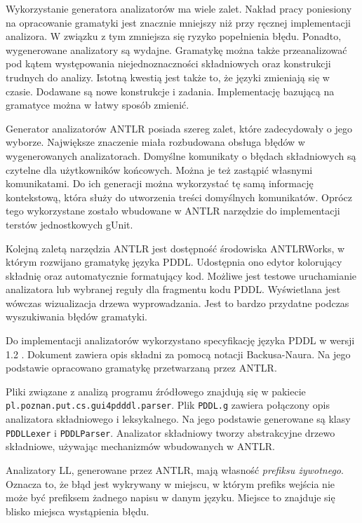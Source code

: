 Wykorzystanie generatora analizatorów ma wiele zalet. Nakład pracy poniesiony na
opracowanie gramatyki jest znacznie mniejszy niż przy ręcznej implementacji analizora.
W związku z tym zmniejsza się ryzyko popełnienia błędu. Ponadto, wygenerowane analizatory są 
wydajne. Gramatykę można także przeanalizować pod kątem występowania niejednoznaczności
składniowych
oraz konstrukcji trudnych do analizy. Istotną kwestią jest także to, że
języki zmieniają się w czasie. Dodawane są nowe konstrukcje i zadania. Implementację
bazującą na gramatyce można w łatwy sposób zmienić.

Generator analizatorów ANTLR posiada szereg zalet, które zadecydowały o jego wyborze.
Największe znaczenie miała rozbudowana obsługa błędów w wygenerowanych analizatorach.
Domyślne komunikaty o błędach składniowych są czytelne dla użytkowników końcowych.
Można je też zastąpić własnymi komunikatami. Do ich generacji można wykorzystać tę samą 
informację kontekstową, która służy do utworzenia treści domyślnych komunikatów.
Oprócz tego wykorzystane zostało wbudowane w ANTLR narzędzie do implementacji
terstów jednostkowych gUnit.

Kolejną zaletą narzędzia ANTLR jest dostępność środowiska ANTLRWorks, w którym
rozwijano gramatykę języka PDDL. Udostępnia 
ono edytor kolorujący składnię oraz automatycznie formatujący kod. Możliwe jest
testowe uruchamianie analizatora lub wybranej reguły dla fragmentu kodu PDDL.
Wyświetlana jest wówczas wizualizacja drzewa wyprowadzania. Jest to bardzo przydatne
podczas wyszukiwania błędów gramatyki.

Do implementacji analizatorów wykorzystano specyfikację języka PDDL w wersji 1.2 \cite{pddl}.
Dokument zawiera opis składni za pomocą notacji Backusa-Naura. Na jego podstawie opracowano
gramatykę przetwarzaną przez ANTLR.

\begin{sloppypar}
Pliki związane z analizą programu źródłowego znajdują się w pakiecie 
\texttt{pl.poznan.put.cs.gui4pdddl.parser}.
Plik \texttt{PDDL.g} zawiera połączony opis analizatora
składniowego i leksykalnego.  %
Na jego podstawie generowane są klasy \texttt{PDDLLexer} i \texttt{PDDLParser}.
Analizator składniowy tworzy abstrakcyjne drzewo składniowe, używając mechanizmów
wbudowanych w ANTLR.
\end{sloppypar}


Analizatory LL, generowane przez ANTLR, mają własność \emph{prefiksu żywotnego}. 
Oznacza to, że błąd jest wykrywany w miejscu, w którym prefiks wejścia nie może
być prefiksem żadnego napisu w danym języku. Miejsce to znajduje się blisko miejsca
wystąpienia błędu.

